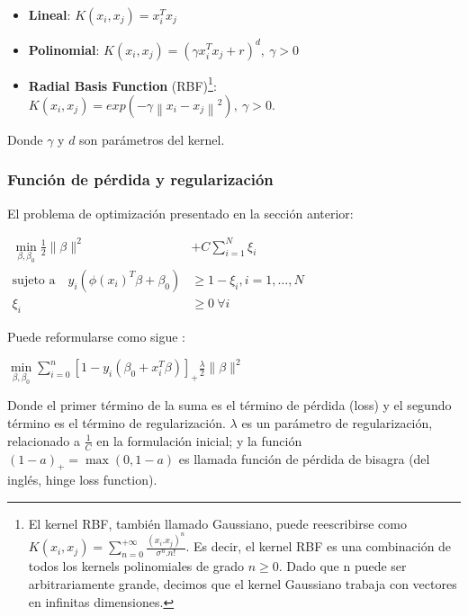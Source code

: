 \begin{itemize}
\item \textbf{Lineal}: $K(x_i,x_j) = x_i^T x_j$
\item \textbf{Polinomial}: $K(x_i,x_j)= (\gamma x_i^T x_j + r)^d , \ \gamma > 0$
\item \textbf{Radial Basis Function} (RBF)\footnote{El kernel RBF, también llamado Gaussiano, puede reescribirse como $K(x_i,x_j)=\sum\limits_{n=0}^{+\infty}\frac{(x_i.x_j)^n}{\sigma^n.n!}$. Es decir, el kernel RBF es una combinación de todos los kernels polinomiales de grado $n\geq0$. Dado que n puede ser arbitrariamente grande, decimos que el kernel Gaussiano trabaja con vectores en infinitas dimensiones.}: $K(x_i,x_j)= exp (-\gamma\left\| x_i - x_j \right\|^2  ), \ \gamma>0.$
\end{itemize}

Donde $\gamma$ y $d$ son parámetros del kernel.

\subsubsection{Función de pérdida y regularización}
\label{regper}
El problema de optimización presentado en la sección anterior:

\begin{center}
$\begin{aligned}
\min\limits_{\beta, \beta_0}   \frac{1}{2} \| \beta \|^2 &+ C \sum\limits_{i=1}^N \xi_i \\
\textrm{sujeto a} \quad  y_{i}(\phi(x_i)^T \beta + \beta_0)
  &\geq 1 - \xi_i, i=1,\ldots,N    \\
  \xi_i &\geq 0 \ \forall i 
\end{aligned}
$
\end{center}

Puede reformularse como sigue \cite{statisticallearning} \cite{lopezmartinez2017regularization}:

\begin{center}
$
\min\limits_{\beta, \beta_0}  \sum_{i=0}^n [1-y_i(\beta_0 + x_i^T \beta)]_+ \frac{\lambda}{2} \| \beta \|^2
$
\end{center}

Donde el primer término de la suma es el término de pérdida (loss) y el segundo término es el término de regularización. $\lambda$ es un parámetro de regularización, relacionado a $\frac{1}{C}$ en la formulación inicial; y la función $(1-a)_+ = \max(0,1-a)$ es llamada función de pérdida de bisagra (del inglés, hinge loss function). \\

